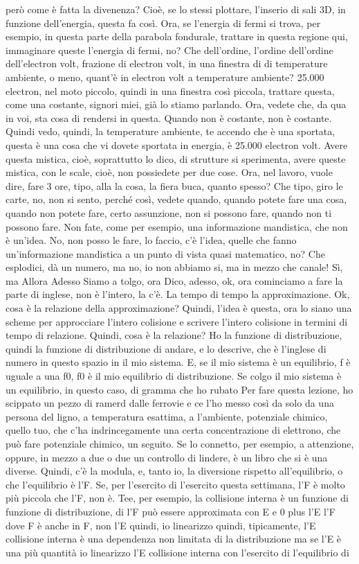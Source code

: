però come è fatta la divenenza? Cioè, se lo stessi plottare, l'inserio di sali 3D, in funzione dell'energia, questa fa così. Ora, se l'energia di fermi si trova, per esempio, in questa parte della parabola fondurale, trattare in questa regione qui, immaginare queste l'energia di fermi, no? Che dell'ordine, l'ordine dell'ordine dell'electron volt, frazione di electron volt, in una finestra di di temperature ambiente, o meno, quant'è in electron volt a temperature ambiente? 25.000 electron, nel moto piccolo, quindi in una finestra così piccola, trattare questa, come una costante, signori miei, già lo stiamo parlando. Ora, vedete che, da qua in voi, sta cosa di rendersi in questa. Quando non è costante, non è costante. Quindi vedo, quindi, la temperature ambiente, te accendo che è una sportata, questa è una cosa che vi dovete sportata in energia, è 25.000 electron volt. Avere questa mistica, cioè, soprattutto lo dico, di strutture si sperimenta, avere queste mistica, con le scale, cioè, non possiedete per due cose. Ora, nel lavoro, vuole dire, fare 3 ore, tipo, alla la cosa, la fiera buca, quanto spesso? Che tipo, giro le carte, no, non si sento, perché così, vedete quando, quando potete fare una cosa, quando non potete fare, certo assunzione, non si possono fare, quando non ti possono fare. Non fate, come per esempio, una informazione mandistica, che non è un'idea. No, non posso le fare, lo faccio, c'è l'idea, quelle che fanno un'informazione mandistica a un punto di vista quasi matematico, no? Che esplodici, dà un numero, ma no, io non abbiamo si, ma in mezzo che canale! Sì, ma Allora Adesso Siamo a tolgo, ora Dico, adesso, ok, ora cominciamo a fare la parte di inglese, non è l'intero, la c'è. La tempo di tempo la approximazione. Ok, cosa è la relazione della approximazione? Quindi, l'idea è questa, ora lo siano una scheme per approcciare l'intero colisione e scrivere l'intero colisione in termini di tempo di relazione. Quindi, cosa è la relazione? Ho la funzione di distribuzione, quindi la funzione di distribuzione di andare, e lo descrive, che è l'inglese di numero in questo spazio in il mio sistema. E, se il mio sistema è un equilibrio, f è uguale a una f0, f0 è il mio equilibrio di distribuzione. Se colgo il mio sistema è un equilibrio, in questo caso, di gramma che ho rubato Per fare questa lezione, ho scippato un pezzo di ramerd dalle ferrovie e ce l'ho messo così da solo da una persona del ligno, a temperatura esattima, a l'ambiente, potenziale chimico, quello tuo, che c'ha indrincegamente una certa concentrazione di elettrono, che può fare potenziale chimico, un seguito. Se lo connetto, per esempio, a attenzione, oppure, in mezzo a due o due un controllo di lindere, è un libro che si è una diverse. Quindi, c'è la modula, e, tanto io, la diversione rispetto all'equilibrio, o che l'equilibrio è l'F. Se, per l'esercito di l'esercito questa settimana, l'F è molto più piccola che l'F, non è. Tee, per esempio, la collisione interna è un funzione di funzione di distribuzione, di l'F può essere approximata con E e 0 plus l'E l'F dove F è anche in F, non l'E quindi, io linearizzo quindi, tipicamente, l'E collisione interna è una dependenza non limitata di la distribuzione ma se l'E è una più quantità io linearizzo l'E collisione interna con l'esercito di l'equilibrio di 